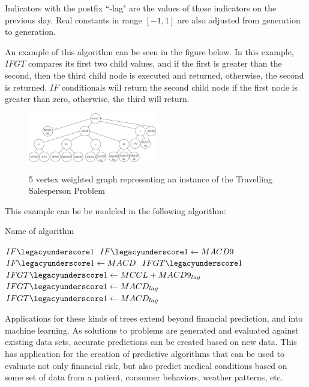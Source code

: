 \documentclass{article}
\renewcommand{\_}{\ifincsname_\else\legacyunderscore\fi}
\begin{document}
Indicators with the postfix ``-lag" are the values of those indicators on the previous day. Real constants in range $[-1, 1]$ are also adjusted from generation to generation.

An example of this algorithm can be seen in the figure below. In this example, $IFGT$ compares its first two child values, and if the first is greater than the second, then the third child node is executed and returned, otherwise, the second is returned. $IF$ conditionals will return the second child node if the first node is greater than zero, otherwise, the third will return.
\begin{figure}[!h]
    \centering
    \includegraphics[width=0.5\textwidth,keepaspectratio]{gen_alg_tree.jpg}
    \label{fig:space_partition}
    \caption{5 vertex weighted graph representing an instance of the Travelling Salesperson Problem}
\end{figure}

This example can be be modeled in the following algorithm:

\begin{algorithm}[!h]
    \DontPrintSemicolon
    \caption{Name of algorithm}
    \label{alg:sp500}

    $IF\_1$\;
    {
        $IF\_1 \gets MACD9$\;
    }
    \Else
    {
        $IF\_1 \gets MACD$\;
    }
    $IFGT\_1$\;
    \If{$SP500*0.74 > IF\_1$}
    {
        $IFGT\_1 \gets MCCL + MACD9_{lag}$\;
    }
    \Else
    {
        {
            $IFGT\_1 \gets MACD_{lag}$\;
        }
        \Else
        {
            $IFGT\_1 \gets MACD_{lag}$\;
        }
    }
    \If{$MCCL_{lag} > IFGT\_1$}
    {
        \;
    }
    \Else
    {
        \;
    }
\end{algorithm}
\newpage

Applications for these kinds of trees extend beyond financial prediction, and into machine learning. As solutions to problems are generated and evaluated against existing data sets, accurate predictions can be created based on new data. This has application for the creation of predictive algorithms that can be used to evaluate not only financial risk, but also predict medical conditions based on some set of data from a patient, consumer behaviors, weather patterns, etc.  
\end{document}
